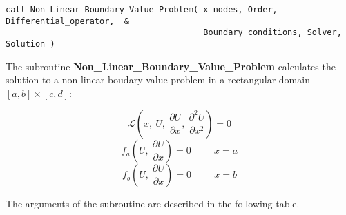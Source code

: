 \lstset{language=Fortran}
\begin{lstlisting}[frame=trBL]
call Non_Linear_Boundary_Value_Problem( x_nodes, Order, Differential_operator,  & 
                                        Boundary_conditions, Solver, Solution )   
\end{lstlisting}   

The subroutine \textbf{Non\_Linear\_Boundary\_Value\_Problem} calculates the solution to a non linear boudary value problem  in a rectangular domain $[a,b] \times [c,d]$:

\begin{equation*}
\mathscr{L}\left(x,\ U, \ \frac{\partial U}{\partial x}, \ \frac{\partial^2 U}{\partial x^2} \right) = 0
\end{equation*}
\begin{equation*}
f_a\left(U, \ \frac{\partial U}{\partial x}\right)=0 \hspace{1cm} x=a
\end{equation*}
\begin{equation*}
f_b\left(U, \ \frac{\partial U}{\partial x}\right)=0 \hspace{1cm} x=b
\end{equation*}



The arguments of the subroutine are described in the following table.

